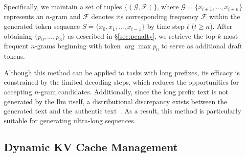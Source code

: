 Specifically, we maintain a set of tuples $\{(\mathcal{G}, \mathcal{F})\}$, where $\mathcal{G}=\{x_{i+1}, ..., x_{i+n}\}$ represents an $n$-gram and $\mathcal{F}$ denotes its corresponding frequency $\mathcal{F}$ within the generated token sequence $S=\{x_0, x_1, ..., x_{t-1}\}$ by time step $t$ ($t \geq n$). After obtaining $\{p_0,\ldots, p_3\}$ as described in \S \ref{sec:penalty}, we retrieve the top-$k$ most frequent $n$-grams beginning with token $\arg\max p_0$ to serve as additional draft tokens.

Although this method can be applied to tasks with long prefixes, its efficacy is constrained by the limited decoding steps, which reduces the opportunities for accepting $n$-gram candidates. Additionally, since the long prefix text is not generated by the \ac{llm} itself, a distributional discrepancy exists between the generated text and the authentic text~\citep{detectgpt}. As a result, this method is particularly suitable for generating ultra-long sequences.
 
\subsection{Dynamic KV Cache Management}
\label{sec:kv_update}
